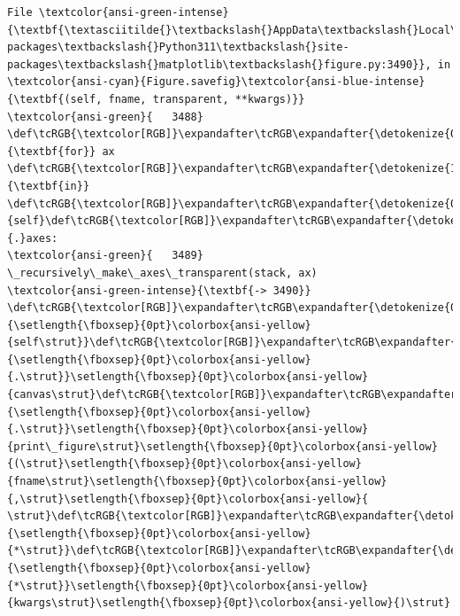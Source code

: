\documentclass[11pt]{article}
\begin{document}
\begin{Verbatim}[commandchars=\\\{\}, frame=single, framerule=2mm, rulecolor=\color{outerrorbackground}]
File \textcolor{ansi-green-intense}{\textbf{\textasciitilde{}\textbackslash{}AppData\textbackslash{}Local\textbackslash{}Packages\textbackslash{}PythonSoftwareFoundation.Python.3.11\_qbz5n2kfra8p0\textbackslash{}LocalCache\textbackslash{}local-packages\textbackslash{}Python311\textbackslash{}site-packages\textbackslash{}matplotlib\textbackslash{}figure.py:3490}}, in \textcolor{ansi-cyan}{Figure.savefig}\textcolor{ansi-blue-intense}{\textbf{(self, fname, transparent, **kwargs)}}
\textcolor{ansi-green}{   3488}     \def\tcRGB{\textcolor[RGB]}\expandafter\tcRGB\expandafter{\detokenize{0,135,0}}{\textbf{for}} ax \def\tcRGB{\textcolor[RGB]}\expandafter\tcRGB\expandafter{\detokenize{175,0,255}}{\textbf{in}} \def\tcRGB{\textcolor[RGB]}\expandafter\tcRGB\expandafter{\detokenize{0,135,0}}{self}\def\tcRGB{\textcolor[RGB]}\expandafter\tcRGB\expandafter{\detokenize{98,98,98}}{.}axes:
\textcolor{ansi-green}{   3489}         \_recursively\_make\_axes\_transparent(stack, ax)
\textcolor{ansi-green-intense}{\textbf{-> 3490}} \def\tcRGB{\textcolor[RGB]}\expandafter\tcRGB\expandafter{\detokenize{0,135,0}}{\setlength{\fboxsep}{0pt}\colorbox{ansi-yellow}{self\strut}}\def\tcRGB{\textcolor[RGB]}\expandafter\tcRGB\expandafter{\detokenize{98,98,98}}{\setlength{\fboxsep}{0pt}\colorbox{ansi-yellow}{.\strut}}\setlength{\fboxsep}{0pt}\colorbox{ansi-yellow}{canvas\strut}\def\tcRGB{\textcolor[RGB]}\expandafter\tcRGB\expandafter{\detokenize{98,98,98}}{\setlength{\fboxsep}{0pt}\colorbox{ansi-yellow}{.\strut}}\setlength{\fboxsep}{0pt}\colorbox{ansi-yellow}{print\_figure\strut}\setlength{\fboxsep}{0pt}\colorbox{ansi-yellow}{(\strut}\setlength{\fboxsep}{0pt}\colorbox{ansi-yellow}{fname\strut}\setlength{\fboxsep}{0pt}\colorbox{ansi-yellow}{,\strut}\setlength{\fboxsep}{0pt}\colorbox{ansi-yellow}{ \strut}\def\tcRGB{\textcolor[RGB]}\expandafter\tcRGB\expandafter{\detokenize{98,98,98}}{\setlength{\fboxsep}{0pt}\colorbox{ansi-yellow}{*\strut}}\def\tcRGB{\textcolor[RGB]}\expandafter\tcRGB\expandafter{\detokenize{98,98,98}}{\setlength{\fboxsep}{0pt}\colorbox{ansi-yellow}{*\strut}}\setlength{\fboxsep}{0pt}\colorbox{ansi-yellow}{kwargs\strut}\setlength{\fboxsep}{0pt}\colorbox{ansi-yellow}{)\strut}


\end{Verbatim}
\end{document}
